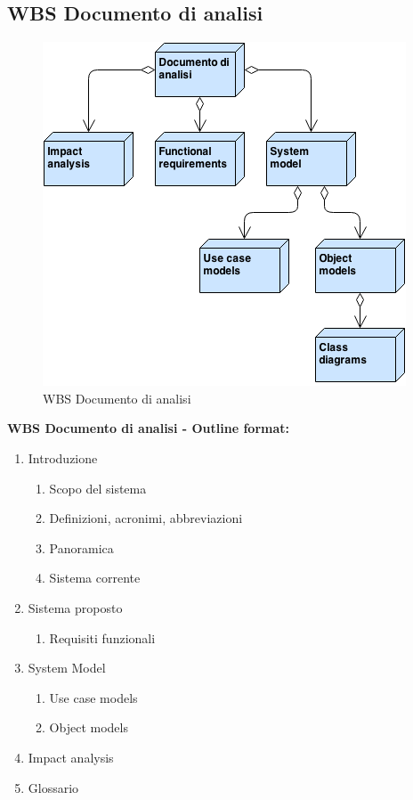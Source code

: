 \subsection{WBS Documento di analisi}
\begin{figure}[ht]
\centering
\includegraphics[width=.5\textwidth]{img/wbs_rad.png}
\caption{WBS Documento di analisi} 
\end{figure}
\textbf{WBS Documento di analisi - Outline format:}
\begin{enumerate}
\item Introduzione
\begin{enumerate}[label*=\arabic*.]
\item Scopo del sistema
\item Definizioni, acronimi, abbreviazioni
\item Panoramica
\item Sistema corrente
\end{enumerate}
\item Sistema proposto
\begin{enumerate}[label*=\arabic*.]
\item Requisiti funzionali
\end{enumerate}
\item System Model
\begin{enumerate}[label*=\arabic*.]
\item Use case models
\item Object models
\end{enumerate}
\item Impact analysis
\item Glossario
\end{enumerate}
\clearpage

